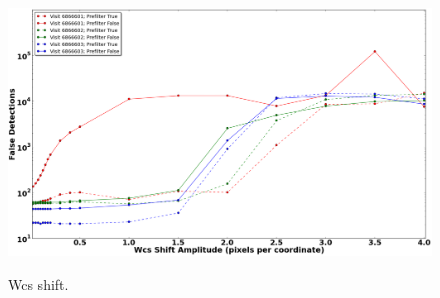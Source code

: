 \documentclass[prd, nofootinbib, floatfix, 11pt,tightenlines,times]{article}
\begin{document}
\begin{figure}
\includegraphics[width=1.0\textwidth]{figures/wcs_shift.eps} \\
\caption{Wcs shift.}
\label{wcsshift}
\end{figure}
\end{document}
